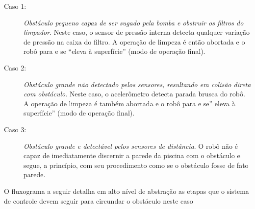 \begin{description}
\item[Caso 1:] \textit{Obstáculo pequeno capaz de ser sugado pela bomba e obstruir os
filtros do limpador}. Neste caso, o sensor de pressão interna detecta qualquer
variação de pressão na caixa do filtro.  A operação de limpeza é então abortada
e o robô para e se “eleva à superfície” (modo de operação final).
\item[Caso 2:] \textit{Obstáculo grande não detectado pelos sensores, resultando em
colisão direta com obstáculo}. Neste caso, o acelerômetro detecta parada brusca
do robô. A operação de limpeza é  também abortada e o robô para e se” eleva à
superfície” (modo de operação final).
\item[Caso 3:] \textit{Obstáculo grande e detectável pelos sensores de distância}. O
robô não é capaz de imediatamente discernir a parede da piscina com o obstáculo
e segue, a princípio, com seu procedimento como se o obstáculo fosse de fato parede.
\end{description}
\par
O fluxograma a seguir detalha em alto nível de abstração as etapas que o sistema
de controle devem seguir para circundar o obstáculo neste caso
\par
